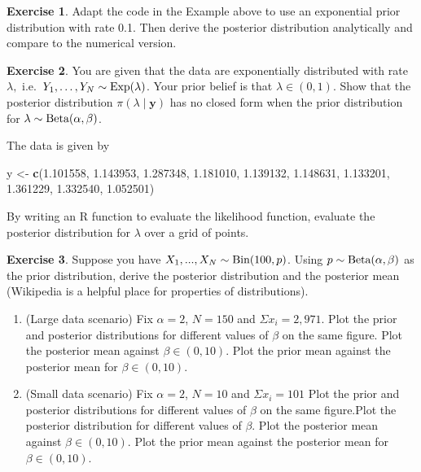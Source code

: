 \documentclass[
]{book}
\newenvironment{Shaded}{\begin{snugshade}}{\end{snugshade}}
\newcommand{\FloatTok}[1]{\textcolor[rgb]{0.00,0.00,0.81}{#1}}
\newcommand{\FunctionTok}[1]{\textcolor[rgb]{0.13,0.29,0.53}{\textbf{#1}}}
\newcommand{\NormalTok}[1]{#1}
\newcommand{\OtherTok}[1]{\textcolor[rgb]{0.56,0.35,0.01}{#1}}
\providecommand{\tightlist}{%
  \setlength{\itemsep}{0pt}\setlength{\parskip}{0pt}}
\theoremstyle{definition}
\theoremstyle{definition}
\theoremstyle{definition}
\newtheorem{exercise}{Exercise}[chapter]
\theoremstyle{definition}
\theoremstyle{remark}
\begin{document}
\begin{exercise}
Adapt the code in the Example above to use an exponential prior distribution with rate 0.1. Then derive the posterior distribution analytically and compare to the numerical version.
\end{exercise}

\begin{exercise}

You are given that the data are exponentially distributed with rate \(\lambda,\) i.e.~\(Y_1, \ldots, Y_N \sim \hbox{Exp}(\lambda)\). Your prior belief is that \(\lambda \in (0, 1)\). Show that the posterior distribution \(\pi(\lambda \mid \boldsymbol{y})\) has no closed form when the prior distribution for \(\lambda \sim \hbox{Beta}(\alpha, \beta)\).

The data is given by

\begin{Shaded}
\begin{Highlighting}[]
\NormalTok{y }\OtherTok{\textless{}{-}} \FunctionTok{c}\NormalTok{(}\FloatTok{1.101558}\NormalTok{, }\FloatTok{1.143953}\NormalTok{, }\FloatTok{1.287348}\NormalTok{, }\FloatTok{1.181010}\NormalTok{, }\FloatTok{1.139132}\NormalTok{, }\FloatTok{1.148631}\NormalTok{, }\FloatTok{1.133201}\NormalTok{, }\FloatTok{1.361229}\NormalTok{, }\FloatTok{1.332540}\NormalTok{, }\FloatTok{1.052501}\NormalTok{)}
\end{Highlighting}
\end{Shaded}

\end{exercise}

By writing an R function to evaluate the likelihood function, evaluate the posterior distribution for \(\lambda\) over a grid of points.

\begin{exercise}

Suppose you have \(X_1, ..., X_N \sim \hbox{Bin}(100, p)\). Using \(p \sim \hbox{Beta}(\alpha, \beta)\) as the prior distribution, derive the posterior distribution and the posterior mean (Wikipedia is a helpful place for properties of distributions).

\begin{enumerate}
\def\labelenumi{\arabic{enumi}.}
\tightlist
\item
  (Large data scenario) Fix \(\alpha = 2\), \(N = 150\) and \(\Sigma x_i = 2,971\). Plot the prior and posterior distributions for different values of \(\beta\) on the same figure. Plot the posterior mean against \(\beta \in (0, 10)\). Plot the prior mean against the posterior mean for \(\beta \in (0, 10)\).
\item
  (Small data scenario) Fix \(\alpha = 2\), \(N = 10\) and \(\Sigma x_i = 101\) Plot the prior and posterior distributions for different values of \(\beta\) on the same figure.Plot the posterior distribution for different values of \(\beta\). Plot the posterior mean against \(\beta \in (0, 10)\). Plot the prior mean against the posterior mean for \(\beta \in (0, 10)\).
\end{enumerate}

\end{exercise}
\end{document}
